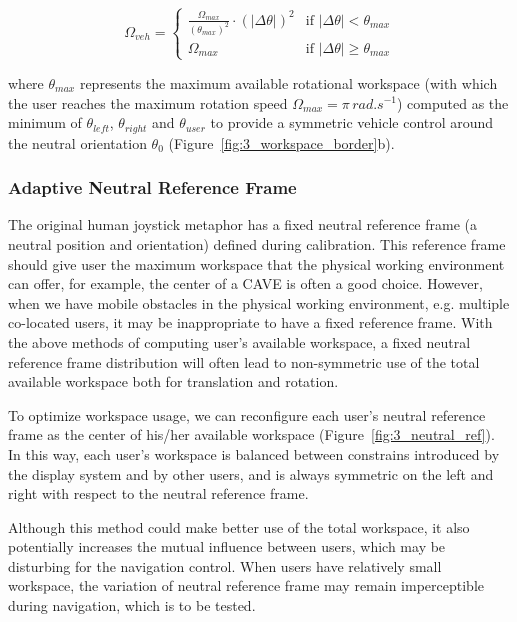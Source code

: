\begin{equation}
\Omega_{veh}=
  \begin{cases}
    \frac{\Omega_{max}}{(\theta_{max})^{2}}\cdot(|\Delta\theta|)^{2} & \text{if } |\Delta\theta|<\theta_{max} \\
    \Omega_{max} & \text{if } |\Delta\theta| \geq \theta_{max}
  \end{cases}
\end{equation}

where $\theta_{max}$ represents the maximum available rotational workspace (with which the user reaches the maximum rotation speed $\Omega_{max}=\pi\, rad.s^{-1}$) computed as the minimum of $\theta_{left}$, $\theta_{right}$ and $\theta_{user}$ to provide a symmetric vehicle control around the neutral orientation $\theta_{0}$ (Figure~\ref{fig:3_workspace_border}b).  


\subsubsection{Adaptive Neutral Reference Frame}

The original human joystick metaphor has a fixed neutral reference frame (a neutral position and orientation) defined during calibration. This reference frame should give user the maximum workspace that the physical working environment can offer, for example, the center of a CAVE is often a good choice. However, when we have mobile obstacles in the physical working environment, e.g. multiple co-located users, it may be inappropriate to have a fixed reference frame. With the above methods of computing user's available workspace, a fixed neutral reference frame distribution will often lead to non-symmetric use of the total available workspace both for translation and rotation.

To optimize workspace usage, we can reconfigure each user's neutral reference frame as the center of his/her available workspace (Figure~\ref{fig:3_neutral_ref}). In this way, each user's workspace is balanced between constrains introduced by the display system and by other users, and is always symmetric on the left and right with respect to the neutral reference frame.

Although this method could make better use of the total workspace, it also potentially increases the mutual influence between users, which may be disturbing for the navigation control. When users have relatively small workspace, the variation of neutral reference frame may remain imperceptible during navigation, which is to be tested.   

